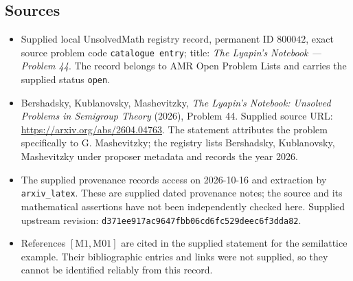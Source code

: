 \documentclass[11pt]{article}
\begin{document}
\subsection{Sources}
\begin{itemize}
\item Supplied local UnsolvedMath registry record, permanent ID \(800042\), exact source problem code \texttt{catalogue entry}; title: \emph{The Lyapin's Notebook --- Problem 44}. The record belongs to AMR Open Problem Lists and carries the supplied status \texttt{open}.
\item Bershadsky, Kublanovsky, Mashevitzky, \emph{The Lyapin's Notebook: Unsolved Problems in Semigroup Theory} (2026), Problem 44. Supplied source URL: \url{https://arxiv.org/abs/2604.04763}. The statement attributes the problem specifically to G. Mashevitzky; the registry lists Bershadsky, Kublanovsky, Mashevitzky under proposer metadata and records the year 2026.
\item The supplied provenance records access on 2026-10-16 and extraction by \texttt{arxiv\_latex}. These are supplied dated provenance notes; the source and its mathematical assertions have not been independently checked here. Supplied upstream revision: \texttt{d371ee917ac9647fbb06cd6fc529deec6f3dda82}.
\item References \([\mathrm{M1},\mathrm{M01}]\) are cited in the supplied statement for the semilattice example. Their bibliographic entries and links were not supplied, so they cannot be identified reliably from this record.
\end{itemize}
\end{document}
